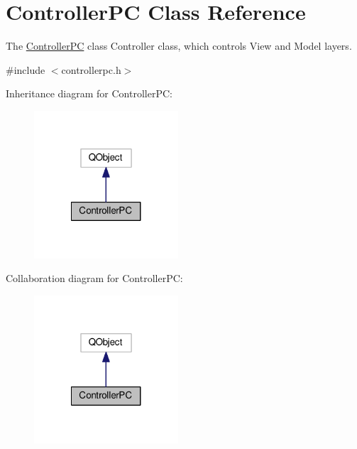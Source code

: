 \hypertarget{class_controller_p_c}{\section{Controller\-P\-C Class Reference}
\label{class_controller_p_c}
}


The \hyperlink{class_controller_p_c}{Controller\-P\-C} class Controller class, which controls View and Model layers.  




{\ttfamily \#include $<$controllerpc.\-h$>$}



Inheritance diagram for Controller\-P\-C\-:
\nopagebreak
\begin{figure}[H]
\begin{center}
\leavevmode
\includegraphics[width=152pt]{class_controller_p_c__inherit__graph}
\end{center}
\end{figure}


Collaboration diagram for Controller\-P\-C\-:
\nopagebreak
\begin{figure}[H]
\begin{center}
\leavevmode
\includegraphics[width=152pt]{class_controller_p_c__coll__graph}
\end{center}
\end{figure}

